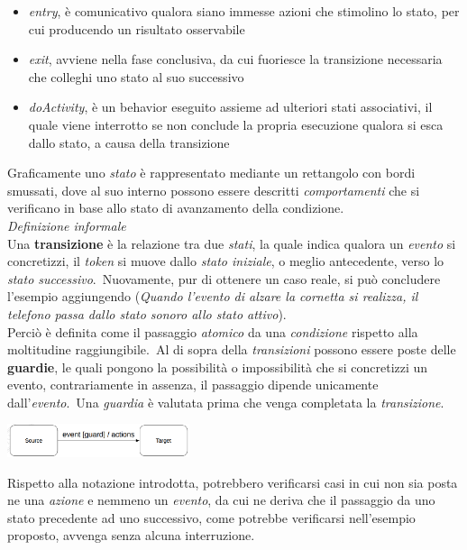 \documentclass{article}
\begin{document}
\begin{itemize}[label={-}]
    \itemsep0em
    \item \textit{entry}, è comunicativo qualora siano immesse azioni che stimolino lo stato, per cui producendo un risultato osservabile
    \item \textit{exit}, avviene nella fase conclusiva, da cui fuoriesce la transizione necessaria che colleghi uno stato al suo successivo
    \item \textit{doActivity}, è un behavior eseguito assieme ad ulteriori stati associativi, il quale viene interrotto se non conclude la propria esecuzione qualora si esca dallo stato, a causa della transizione 
\end{itemize}
Graficamente uno \textit{stato} è rappresentato mediante un rettangolo con bordi smussati, dove al suo interno possono essere descritti \textit{comportamenti} che si verificano in base allo stato di avanzamento della condizione.\vspace*{14pt}\\
\textit{Definizione informale}\\Una \textbf{transizione} è la relazione tra due \textit{stati}, la quale indica qualora un \textit{evento} si concretizzi, il \textit{token} si muove dallo \textit{stato iniziale}, o meglio antecedente, verso lo \textit{stato successivo}.\ Nuovamente, pur di ottenere un caso reale, si può concludere l'esempio aggiungendo (\textit{Quando l'evento di alzare la cornetta si realizza, il telefono passa dallo stato sonoro allo stato attivo}).\vspace*{14pt}\\
Perciò è definita come il passaggio \textit{atomico} da una \textit{condizione} rispetto alla moltitudine raggiungibile.\ Al di sopra della \textit{transizioni} possono essere poste delle \textbf{guardie}, le quali pongono la possibilità o impossibilità che si concretizzi un evento, contrariamente in assenza, il passaggio dipende unicamente dall'\textit{evento}.\ Una \textit{guardia} è valutata prima che venga completata la \textit{transizione}.\vspace*{7pt}
\begin{center}
    \includegraphics*[width=0.4\textwidth]{foto 1.png}
\end{center}
Rispetto alla notazione introdotta, potrebbero verificarsi casi in cui non sia posta ne una \textit{azione} e nemmeno un \textit{evento}, da cui ne deriva che il passaggio da uno stato precedente ad uno successivo, come potrebbe verificarsi nell'esempio proposto, avvenga senza alcuna interruzione.\vspace*{14pt}\\
\end{document}

